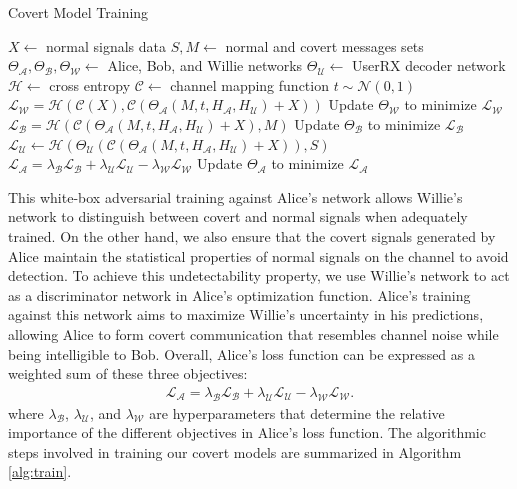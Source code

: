 \begin{algorithm}[tp!]
	\caption{Covert Model Training}\label{alg:train}
	\small
	\begin{algorithmic}
		\State $X \gets$ normal signals data
		\State $S, M \gets$ normal and covert messages sets
		\State $\Theta_{\mathcal{A}}, \Theta_{\mathcal{B}}, \Theta_{\mathcal{W}} \gets$ Alice, Bob, and Willie networks
		\State $\Theta_{\mathcal{U}} \gets$ UserRX decoder network
		\State $\mathcal{H} \gets$ cross entropy 
		\State $\mathcal{C} \gets$ channel mapping function
		\State $t \sim \mathcal{N}(0, 1)$
		\State $\mathcal{L}_{\mathcal{W}} = \mathcal{H}(\mathcal{C}(X), \mathcal{C}(\Theta_{\mathcal{A}}(M, t, H_{\mathcal{A}}, H_{\mathcal{U}}) + X))$
		\State Update $\Theta_{\mathcal{W}}$ to minimize $\mathcal{L}_{\mathcal{W}}$
		\State $\mathcal{L}_{\mathcal{B}} = \mathcal{H}(\mathcal{C}(\Theta_{\mathcal{A}}(M, t, H_{\mathcal{A}}, H_{\mathcal{U}}) + X), M)$
		\State Update $\Theta_{\mathcal{B}}$ to minimize $\mathcal{L}_{\mathcal{B}}$
		\State $\mathcal{L}_{\mathcal{U}} \gets \mathcal{H}(\Theta_{\mathcal{U}}(\mathcal{C}(\Theta_{\mathcal{A}}(M, t, H_{\mathcal{A}}, H_{\mathcal{U}}) + X)), S)$
		\State
		$\mathcal{L}_{\mathcal{A}} = \lambda_{\mathcal{B}} \mathcal{L}_{\mathcal{B}} + \lambda_{\mathcal{U}} \mathcal{L}_{\mathcal{U}} - \lambda_{\mathcal{W}} \mathcal{L}_{\mathcal{W}}$
		\State Update $\Theta_{\mathcal{A}}$ to minimize $\mathcal{L}_{\mathcal{A}}$
		\EndFor
	\end{algorithmic}
\end{algorithm}

This white-box adversarial training against Alice's network allows Willie's network to distinguish between covert and normal signals when adequately trained. On the other hand, we also ensure that the covert signals generated by Alice maintain the statistical properties of normal signals on the channel to avoid detection. To achieve this undetectability property, we use Willie's network to act as a discriminator network in Alice's optimization function. Alice's training against this network aims to maximize Willie's uncertainty in his predictions, allowing Alice to form covert communication that resembles channel noise while being intelligible to Bob. Overall, Alice's loss function can be expressed as a weighted sum of these three objectives:
\begin{equation}
	\begin{array}{l} \label{alice_loss}
		\mathcal{L}_{\mathcal{A}} = \lambda_{\mathcal{B}} \mathcal{L}_{\mathcal{B}} + \lambda_{\mathcal{U}} \mathcal{L}_{\mathcal{U}} - \lambda_{\mathcal{W}} \mathcal{L}_{\mathcal{W}}.
	\end{array}
\end{equation}
where \(\lambda_{\mathcal{B}}\), \(\lambda_{\mathcal{U}}\), and \(\lambda_{\mathcal{W}}\) are hyperparameters that determine the relative importance of the different objectives in Alice's loss function. The algorithmic steps involved in training our covert models are summarized in Algorithm \ref{alg:train}.


